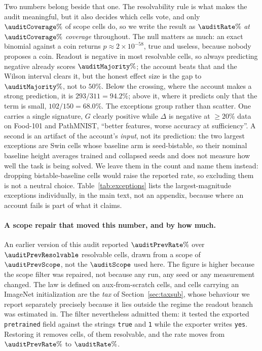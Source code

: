 Two numbers belong beside that one. The resolvability rule is what makes the
audit meaningful, but it also decides which cells vote, and only
$\auditCoverage\%$ of scope cells do, so we write the result as $\auditRate\%$
\emph{at $\auditCoverage\%$ coverage} throughout. The null matters as much: an
exact binomial against a coin returns $p \approx 2\times10^{-58}$, true and
useless, because nobody proposes a coin. Readout is negative in most resolvable
cells, so always predicting negative already scores $\auditMajority\%$; the
account beats that and the Wilson interval clears it, but the honest effect
size is the gap to $\auditMajority\%$, not to $50\%$. Below the crossing,
where the account makes a strong prediction, it is $293/311 = 94.2\%$;
above it, where it predicts only that the term is small, $102/150 =
68.0\%$. The \auditWrong{} exceptions group rather than scatter. One carries a single
signature, $G$ clearly positive while $\Delta$ is negative at ${\geq}20\%$ data
on Food-101 and PathMNIST, ``better features, worse accuracy at
sufficiency''. A second is an artifact of the account's \emph{input}, not its prediction: the two largest exceptions are Swin cells whose baseline
arm is seed-bistable, so their nominal baseline height averages trained and
collapsed seeds and does not measure how well the task is being solved.
We leave them in the count and name them instead: dropping bistable-baseline
cells would raise the reported rate, so excluding them is not a neutral
choice.
Table~\ref{tab:exceptions} lists the largest-magnitude exceptions
individually, in the main text, not an appendix, because where an
account fails is part of what it claims.

\paragraph{A scope repair that moved this number, and by how much.} An
earlier version of this audit reported $\auditPrevRate\%$ over
$\auditPrevResolvable$ resolvable cells, drawn from a scope of $\auditPrevScope$, not the $\auditScope$ used here. The figure is higher because
the scope filter was repaired, not because any run, any seed or any
measurement changed. The law is defined on aux-from-scratch cells, and cells
carrying an ImageNet initialization are the \emph{tax} of
Section~\ref{sec:taxsub}, whose behaviour we report separately precisely
because it lies outside the regime the readout branch was estimated in. The
filter nevertheless admitted them: it tested the exported \texttt{pretrained}
field against the strings \texttt{true} and \texttt{1} while the exporter
writes \texttt{yes}. Restoring it removes \auditExclCells{} cells,
\auditExclResolvable{} of them resolvable, and the rate moves from
$\auditPrevRate\%$ to $\auditRate\%$.

